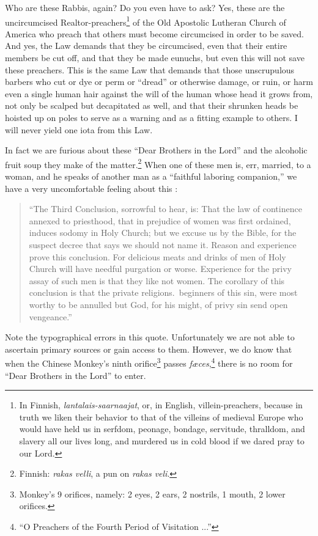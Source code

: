 \documentclass[letterpaper]{article}
\begin{document}
Who are these Rabbis, again?  Do you even have to ask?  Yes, these are the uncircumcised Realtor\textsuperscript\textregistered-preachers\footnote{In Finnish, \foreignlanguage{finnish}{\textit{lantalais-saarnaajat}}, or, in English, villein-preachers, because in truth we liken their behavior to that of the villeins of medieval Europe who would have held us in serfdom, peonage, bondage,  servitude, thralldom, and slavery all our lives long, and murdered us in cold blood if we dared pray to our Lord.} of the Old Apostolic Lutheran Church of America who preach that others must become circumcised in order to be saved.  And yes, the Law demands that they be circumcised, even that their entire members be cut off, and that they be made eunuchs, but even this will not save these preachers.  This is the same Law that demands that those unscrupulous barbers who cut or dye or perm or ``dread'' or otherwise damage, or ruin, or harm even a single human hair against the will of the human whose head it grows from, not only be scalped but decapitated as well, and that their shrunken heads be hoisted up on poles to serve as a warning and as a fitting example to others.  I will never yield one iota from this Law.

In fact we are furious about these ``Dear Brothers in the Lord'' and the alcoholic fruit soup they make of the matter.\footnote{Finnish: \foreignlanguage{finnish}{\textit{rakas velli}}, a pun on \foreignlanguage{finnish}{\textit{rakas veli}}.}
When one of these men is, err, married, to a woman, and he speaks of another man as a ``faithful laboring companion,'' we have a very uncomfortable feeling about this \cite{lollardy12}:
\begin{quote}\small
``The Third Conclusion, sorrowful to hear, is: That the law of continence annexed to priesthood, that in prejudice of women was first ordained, induces sodomy in Holy Church; but we excuse us by the Bible, for the suspect decree that says we should not name it. Reason and experience prove this conclusion. For delicious meats and drinks of men of Holy Church will have needful purgation or worse. Experience for the privy assay of such men is that they like not women. The corollary of this conclusion is that the private {\color{red}religions.\ beginners} of this sin, were most worthy to be annulled but God, for his might, of privy sin send open vengeance.''
\end{quote}
Note the typographical errors in this quote.  Unfortunately we are not able to ascertain primary sources or gain access to them.  However, we do know that when the Chinese Monkey's ninth orifice\footnote{Monkey's 9 orifices, namely: 2 eyes, 2 ears, 2 nostrils, 1 mouth, 2 lower orifices.} passes \textit{f{\ae}ces},\footnote{``O Preachers of the Fourth Period of Visitation ...''} there is no room for ``Dear Brothers in the Lord'' to enter.
\end{document}

